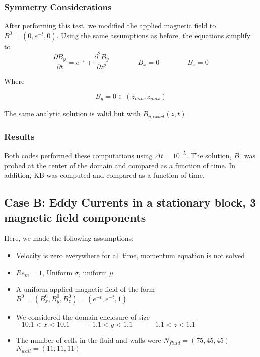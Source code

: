 \documentclass[11pt]{article}
\newcommand{\figS}{22.1em}
\newcommand{\figH}{\figS}
\newcommand{\figW}{\figS}
\begin{document}
\subsubsection{Symmetry Considerations}

After performing this test, we modified the applied magnetic field to $B^0=(0,e^{-t},0)$. Using the same assumptions as before, the equations simplify to
\begin{equation}
	\frac{\partial B_y}{\partial t} 
	=
	e^{-t}
	+
	\frac{\partial^2 B_y}{\partial z^2} 
	\qquad \qquad
	B_x = 0
	\qquad \qquad
	B_z = 0
\end{equation}

Where

\begin{equation}
	B_y = 0
	\in (z_{min}, z_{max})
\end{equation}

The same analytic solution is valid but with $B_{y,exact}(z,t)$.

\subsubsection{Results}
Both codes performed these computations using $\Delta t = 10^{-5}$. The solution, $B_z$ was probed at the center of the domain and compared as a function of time. In addition, KB was computed and compared as a function of time. 

\begin{figure}[H]
 \centering
   \caption[Optional ]{}
\end{figure}

\subsection{Case B: Eddy Currents in a stationary block, 3 magnetic field components}
Here, we made the following assumptions:

\begin{itemize}
\item Velocity is zero everywhere for all time, momentum equation is not solved
\item $Re_m = 1$, Uniform $\sigma$, uniform $\mu$
\item A uniform applied magnetic field of the form $B^0 = (B_x^0,B_y^0,B_z^0) = (e^{-t},e^{-t},1)$
\item We considered the domain enclosure of size $-10.1 < x < 10.1 \qquad -1.1 < y < 1.1 \qquad -1.1 < z < 1.1$
\item The number of cells in the fluid and walls were $N_{fluid} = (75,45,45)$ \qquad $N_{wall} = (11,11,11)$
\end{itemize}
\end{document}
